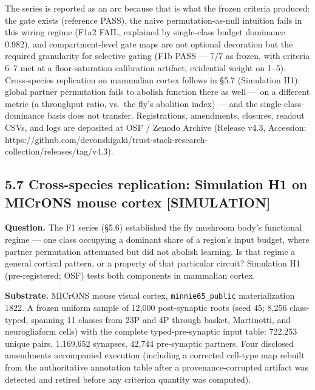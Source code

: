 \documentclass[
]{article}
\begin{document}
The series is reported as an arc because that is what the frozen
criteria produced: the gate exists (reference PASS), the naive
permutation-as-null intuition fails in this wiring regime (F1a2 FAIL,
explained by single-class budget dominance 0.982), and compartment-level
gate maps are not optional decoration but the required granularity for
selective gating (F1b PASS --- 7/7 as frozen, with criteria 6--7 met at
a floor-saturation calibration artifact; evidential weight on 1--5).
Cross-species replication on mammalian cortex follows in §5.7
(Simulation H1): global partner permutation fails to abolish function
there as well --- on a different metric (a throughput ratio, vs.~the
fly's abolition index) --- and the single-class-dominance basis does not
transfer. Registrations, amendments, closures, readout CSVs, and logs
are deposited at OSF / Zenodo Archive (Release v4.3, Accession:
https://github.com/devonshigaki/trust-stack-research-collection/releases/tag/v4.3).

\subsection{5.7 Cross-species replication: Simulation H1 on MICrONS
mouse cortex
{[}SIMULATION{]}}\label{cross-species-replication-simulation-h1-on-microns-mouse-cortex-simulation}

\textbf{Question.} The F1 series (§5.6) established the fly mushroom
body's functional regime --- one class occupying a dominant share of a
region's input budget, where partner permutation attenuated but did not
abolish learning. Is that regime a general cortical pattern, or a
property of that particular circuit? Simulation H1 (pre-registered; OSF)
tests both components in mammalian cortex.

\textbf{Substrate.} MICrONS mouse visual cortex,
\texttt{minnie65\_public} materialization 1822. A frozen uniform sample
of 12,000 post-synaptic roots (seed 45; 8,256 class-typed, spanning 11
classes from 23P and 4P through basket, Martinotti, and neurogliaform
cells) with the complete typed-pre-synaptic input table: 722,253 unique
pairs, 1,169,652 synapses, 42,744 pre-synaptic partners. Four disclosed
amendments accompanied execution (including a corrected cell-type map
rebuilt from the authoritative annotation table after a
provenance-corrupted artifact was detected and retired before any
criterion quantity was computed).
\end{document}
